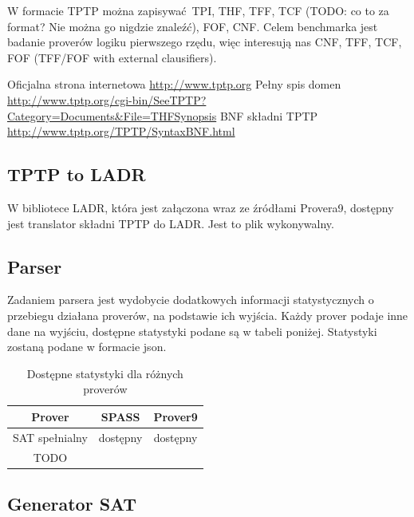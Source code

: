 \documentclass[a4paper,12pt]{article}
\begin{document}
W formacie TPTP można zapisywać \gls{TPI}, \gls{THF}, \gls{TFF}, TCF (TODO: co to za format? Nie można go nigdzie znaleźć), \gls{FOF}, \gls{CNF}. Celem benchmarka jest badanie proverów logiku pierwszego rzędu, więc interesują nas \gls{CNF}, \gls{TFF}, TCF, \gls{FOF} (TFF/FOF with external clausifiers).


\noindent
Oficjalna strona internetowa \url{http://www.tptp.org}
\newline
Pełny spis domen \url{http://www.tptp.org/cgi-bin/SeeTPTP?Category=Documents&File=THFSynopsis}
\newline
BNF składni TPTP \url{http://www.tptp.org/TPTP/SyntaxBNF.html}



\subsection{TPTP to LADR}

W bibliotece \gls{LADR}, która jest załączona wraz ze źródłami Provera9, dostępny jest translator składni TPTP do LADR. Jest to plik wykonywalny.

\subsection{Parser}

Zadaniem parsera jest wydobycie dodatkowych informacji statystycznych o przebiegu działana proverów, na podstawie ich wyjścia.
\newline
Każdy prover podaje inne dane na wyjściu, dostępne statystyki podane są w tabeli poniżej.
\newline
Statystyki zostaną podane w formacie json.

\begin{table}[ht]
  \centering
  \caption{Dostępne statystyki dla różnych proverów}
  \begin{tabular}{ |c|c|c| }
    \hline
    Prover & SPASS & Prover9 \\
    \hline
    SAT spełnialny & dostępny & dostępny \\
    \hline
    TODO & & \\
    \hline
  \end{tabular}
\end{table}


\subsection{Generator SAT}
\end{document}
